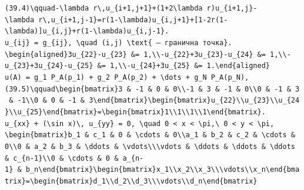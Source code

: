 \documentclass[
  ukrainian,
]{article}
\begin{document}
\texttt{(39.4)\textbackslash{}qquad-\textbackslash{}lambda\ r\textbackslash{},u\_\{i+1,j+1\}+(1+2\textbackslash{}lambda\ r)u\_\{i+1,j\}-\textbackslash{}lambda\ r\textbackslash{},u\_\{i+1,j-1\}=r(1-\textbackslash{}lambda)u\_\{i,j+1\}+{[}1-2r(1-\textbackslash{}lambda){]}u\_\{i,j\}+r(1-\textbackslash{}lambda)u\_\{i,j-1\}.}
\texttt{u\_\{ij\}\ =\ g\_\{ij\},\ \textbackslash{}quad\ (i,j)\ \textbackslash{}text\{\ —\ гранична\ точка\}.}
\texttt{\textbackslash{}begin\{aligned\}3u\_\{22\}-u\_\{23\}\ \&=\ 1,\textbackslash{}\textbackslash{}-u\_\{22\}+3u\_\{23\}-u\_\{24\}\ \&=\ 1,\textbackslash{}\textbackslash{}-u\_\{23\}+3u\_\{24\}-u\_\{25\}\ \&=\ 1,\textbackslash{}\textbackslash{}-u\_\{24\}+3u\_\{25\}\ \&=\ 1.\textbackslash{}end\{aligned\}}
\texttt{u(A)\ =\ g\_1\ P\_A(p\_1)\ +\ g\_2\ P\_A(p\_2)\ +\ \textbackslash{}dots\ +\ g\_N\ P\_A(p\_N),}
\texttt{(39.5)\textbackslash{}qquad\textbackslash{}begin\{bmatrix\}3\ \&\ -1\ \&\ 0\ \&\ 0\textbackslash{}\textbackslash{}-1\ \&\ 3\ \&\ -1\ \&\ 0\textbackslash{}\textbackslash{}0\ \&\ -1\ \&\ 3\ \&\ -1\textbackslash{}\textbackslash{}0\ \&\ 0\ \&\ -1\ \&\ 3\textbackslash{}end\{bmatrix\}\textbackslash{}begin\{bmatrix\}u\_\{22\}\textbackslash{}\textbackslash{}u\_\{23\}\textbackslash{}\textbackslash{}u\_\{24\}\textbackslash{}\textbackslash{}u\_\{25\}\textbackslash{}end\{bmatrix\}=\textbackslash{}begin\{bmatrix\}1\textbackslash{}\textbackslash{}1\textbackslash{}\textbackslash{}1\textbackslash{}\textbackslash{}1\textbackslash{}end\{bmatrix\}.}
\texttt{u\_\{xx\}\ +\ (\textbackslash{}sin\ x)\textbackslash{},\ u\_\{yy\}\ =\ 0,\ \textbackslash{}quad\ 0\ \textless{}\ x\ \textless{}\ \textbackslash{}pi,\textbackslash{}\ 0\ \textless{}\ y\ \textless{}\ \textbackslash{}pi,}
\texttt{\textbackslash{}begin\{bmatrix\}b\_1\ \&\ c\_1\ \&\ 0\ \&\ \textbackslash{}cdots\ \&\ 0\textbackslash{}\textbackslash{}a\_1\ \&\ b\_2\ \&\ c\_2\ \&\ \textbackslash{}cdots\ \&\ 0\textbackslash{}\textbackslash{}0\ \&\ a\_2\ \&\ b\_3\ \&\ \textbackslash{}ddots\ \&\ \textbackslash{}vdots\textbackslash{}\textbackslash{}\textbackslash{}vdots\ \&\ \textbackslash{}ddots\ \&\ \textbackslash{}ddots\ \&\ \textbackslash{}ddots\ \&\ c\_\{n-1\}\textbackslash{}\textbackslash{}0\ \&\ \textbackslash{}cdots\ \&\ 0\ \&\ a\_\{n-1\}\ \&\ b\_n\textbackslash{}end\{bmatrix\}\textbackslash{}begin\{bmatrix\}x\_1\textbackslash{}\textbackslash{}x\_2\textbackslash{}\textbackslash{}x\_3\textbackslash{}\textbackslash{}\textbackslash{}vdots\textbackslash{}\textbackslash{}x\_n\textbackslash{}end\{bmatrix\}=\textbackslash{}begin\{bmatrix\}d\_1\textbackslash{}\textbackslash{}d\_2\textbackslash{}\textbackslash{}d\_3\textbackslash{}\textbackslash{}\textbackslash{}vdots\textbackslash{}\textbackslash{}d\_n\textbackslash{}end\{bmatrix\}}
\end{document}
